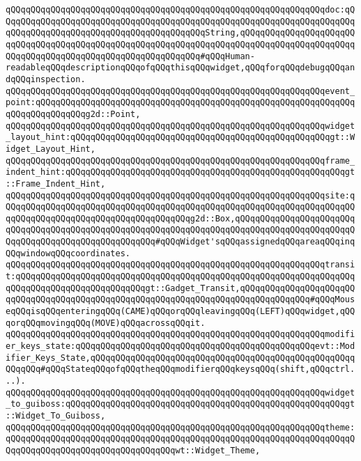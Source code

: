 \verb|qQQqqQQqqQQqqQQqqQQqqQQqqQQqqQQqqQQqqQQqqQQqqQQqqQQqqQQqqQQqqQQqdoc:qQQqqQQqqQQqqQQqqQQqqQQqqQQqqQQqqQQqqQQqqQQqqQQqqQQqqQQqqQQqqQQqqQQqqQQqqQQqqQQqqQQqqQQqqQQqqQQqqQQqqQQqqQQqqQQqString,qQQqqQQqqQQqqQQqqQQqqQQqqQQqqQQqqQQqqQQqqQQqqQQqqQQqqQQqqQQqqQQqqQQqqQQqqQQqqQQqqQQqqQQqqQQqqQQqqQQqqQQqqQQqqQQqqQQqqQQqqQQqqQQqqQQq#qQQqHuman-readableqQQqdescriptionqQQqofqQQqthisqQQqwidget,qQQqforqQQqdebugqQQqandqQQqinspection.|\newline
\verb|qQQqqQQqqQQqqQQqqQQqqQQqqQQqqQQqqQQqqQQqqQQqqQQqqQQqqQQqqQQqqQQqevent_point:qQQqqQQqqQQqqQQqqQQqqQQqqQQqqQQqqQQqqQQqqQQqqQQqqQQqqQQqqQQqqQQqqQQqqQQqqQQqqQQqg2d::Point,|\newline
\verb|qQQqqQQqqQQqqQQqqQQqqQQqqQQqqQQqqQQqqQQqqQQqqQQqqQQqqQQqqQQqqQQqwidget_layout_hint:qQQqqQQqqQQqqQQqqQQqqQQqqQQqqQQqqQQqqQQqqQQqqQQqqQQqgt::Widget_Layout_Hint,|\newline
\verb|qQQqqQQqqQQqqQQqqQQqqQQqqQQqqQQqqQQqqQQqqQQqqQQqqQQqqQQqqQQqqQQqframe_indent_hint:qQQqqQQqqQQqqQQqqQQqqQQqqQQqqQQqqQQqqQQqqQQqqQQqqQQqqQQqgt::Frame_Indent_Hint,|\newline
\verb|qQQqqQQqqQQqqQQqqQQqqQQqqQQqqQQqqQQqqQQqqQQqqQQqqQQqqQQqqQQqqQQqsite:qQQqqQQqqQQqqQQqqQQqqQQqqQQqqQQqqQQqqQQqqQQqqQQqqQQqqQQqqQQqqQQqqQQqqQQqqQQqqQQqqQQqqQQqqQQqqQQqqQQqqQQqqQQqg2d::Box,qQQqqQQqqQQqqQQqqQQqqQQqqQQqqQQqqQQqqQQqqQQqqQQqqQQqqQQqqQQqqQQqqQQqqQQqqQQqqQQqqQQqqQQqqQQqqQQqqQQqqQQqqQQqqQQqqQQqqQQqqQQq#qQQqWidget'sqQQqassignedqQQqareaqQQqinqQQqwindowqQQqcoordinates.|\newline
\verb|qQQqqQQqqQQqqQQqqQQqqQQqqQQqqQQqqQQqqQQqqQQqqQQqqQQqqQQqqQQqqQQqtransit:qQQqqQQqqQQqqQQqqQQqqQQqqQQqqQQqqQQqqQQqqQQqqQQqqQQqqQQqqQQqqQQqqQQqqQQqqQQqqQQqqQQqqQQqqQQqqQQqgt::Gadget_Transit,qQQqqQQqqQQqqQQqqQQqqQQqqQQqqQQqqQQqqQQqqQQqqQQqqQQqqQQqqQQqqQQqqQQqqQQqqQQqqQQqqQQq#qQQqMouseqQQqisqQQqenteringqQQq(CAME)qQQqorqQQqleavingqQQq(LEFT)qQQqwidget,qQQqorqQQqmovingqQQq(MOVE)qQQqacrossqQQqit.|\newline
\verb|qQQqqQQqqQQqqQQqqQQqqQQqqQQqqQQqqQQqqQQqqQQqqQQqqQQqqQQqqQQqqQQqmodifier_keys_state:qQQqqQQqqQQqqQQqqQQqqQQqqQQqqQQqqQQqqQQqqQQqqQQqevt::Modifier_Keys_State,qQQqqQQqqQQqqQQqqQQqqQQqqQQqqQQqqQQqqQQqqQQqqQQqqQQqqQQqqQQq#qQQqStateqQQqofqQQqtheqQQqmodifierqQQqkeysqQQq(shift,qQQqctrl...).|\newline
\verb|qQQqqQQqqQQqqQQqqQQqqQQqqQQqqQQqqQQqqQQqqQQqqQQqqQQqqQQqqQQqqQQqwidget_to_guiboss:qQQqqQQqqQQqqQQqqQQqqQQqqQQqqQQqqQQqqQQqqQQqqQQqqQQqqQQqgt::Widget_To_Guiboss,|\newline
\verb|qQQqqQQqqQQqqQQqqQQqqQQqqQQqqQQqqQQqqQQqqQQqqQQqqQQqqQQqqQQqqQQqtheme:qQQqqQQqqQQqqQQqqQQqqQQqqQQqqQQqqQQqqQQqqQQqqQQqqQQqqQQqqQQqqQQqqQQqqQQqqQQqqQQqqQQqqQQqqQQqqQQqqQQqqQQqwt::Widget_Theme,|\newline
